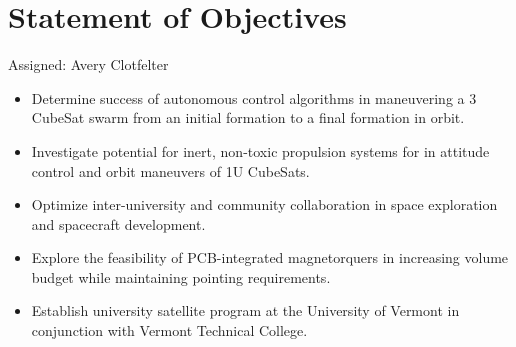 \section{Statement of Objectives}
Assigned: Avery Clotfelter

\begin{itemize}
  \item Determine success of autonomous control algorithms in
    maneuvering a 3 CubeSat swarm from an initial formation to a
    final formation in orbit.
  \item Investigate potential for inert, non-toxic propulsion systems
    for in attitude control and orbit maneuvers of 1U CubeSats.
  \item Optimize inter-university and community collaboration in space
    exploration and spacecraft development.
  \item Explore the feasibility of PCB-integrated magnetorquers in
    increasing volume budget while maintaining pointing requirements.
  \item Establish university satellite program at the University of
    Vermont in conjunction with Vermont Technical College.
\end{itemize}
